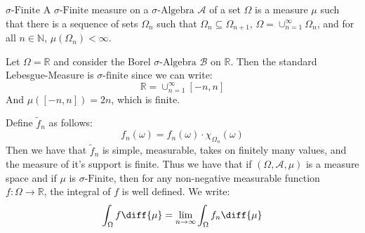         \begin{ldefinition}{$\sigma\textrm{-Finite}$}
            A $\sigma\textrm{-Finite}$ measure on a $\sigma\textrm{-Algebra}$
            $\mathcal{A}$ of a set $\Omega$ is a measure $\mu$ such that there
            is a sequence of sets $\Omega_{n}$ such that
            $\Omega_{n}\subseteq\Omega_{n+1}$,
            $\Omega=\cup_{n=1}^{\infty}\Omega_{n}$, and for all
            $n\in\mathbb{N}$, $\mu(\Omega_{n})<\infty$.
        \end{ldefinition}
        \begin{lexample}
            Let $\Omega=\mathbb{R}$ and consider the Borel
            $\sigma\textrm{-Algebra}$ $\mathcal{B}$ on $\mathbb{R}$. Then the
            standard Lebesgue-Measure is $\sigma\textrm{-finite}$ since we can
            write:
            \begin{equation}
                \mathbb{R}=\cup_{n=1}^{\infty}[-n,n]
            \end{equation}
            And $\mu([-n,n])=2n$, which is finite.
        \end{lexample}
        Define $\tilde{f}_{n}$ as follows:
        \begin{equation}
            f_{n}(\omega)=f_{n}(\omega)\cdot\chi_{\Omega_{n}}(\omega)
        \end{equation}
        Then we have that $\tilde{f}_{n}$ is simple, measurable, takes on
        finitely many values, and the measure of it's support is finite. Thus
        we have that if $(\Omega,\mathcal{A},\mu)$ is a measure space and if
        $\mu$ is $\sigma\textrm{-Finite}$, then for any non-negative measurable
        function $f:\Omega\rightarrow\mathbb{R}$, the integral of $f$ is well
        defined. We write:
        \begin{equation}
            \int_{\Omega}f\diff{\mu}=\underset{n\rightarrow\infty}{\lim}
                \int_{\Omega}f_{n}\diff{\mu}
        \end{equation}
